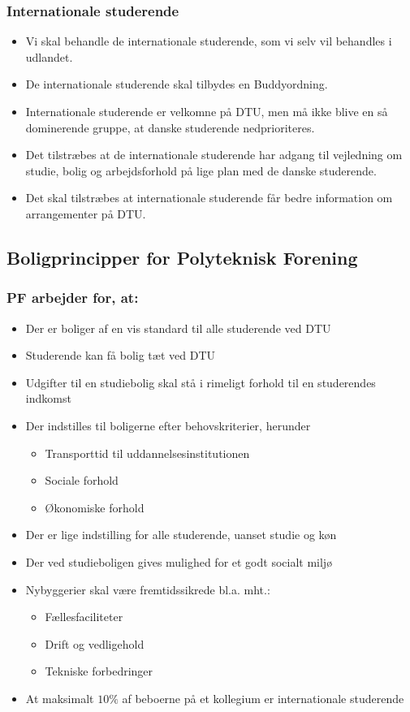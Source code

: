 \subsubsection{Internationale studerende}
\begin{itemize}
\item Vi skal behandle de internationale studerende, som vi selv vil behandles i udlandet.
\item De internationale studerende skal tilbydes en Buddyordning.
\item Internationale studerende er velkomne på DTU, men må ikke blive en så dominerende gruppe, at danske studerende nedprioriteres.
\item Det tilstræbes at de internationale studerende har adgang til vejledning om studie, bolig og arbejdsforhold på lige plan med de danske studerende.
\item Det skal tilstræbes at internationale studerende får bedre information om arrangementer på DTU.
\end{itemize}

\subsection{Boligprincipper for Polyteknisk Forening}
\subsubsection{PF arbejder for, at:}
\begin{itemize}
\item Der er boliger af en vis standard til alle studerende ved DTU
\item Studerende kan få bolig tæt ved DTU
\item Udgifter til en studiebolig skal stå i rimeligt forhold til en studerendes indkomst
\item Der indstilles til boligerne efter behovskriterier, herunder
	\begin{itemize}
	\item Transporttid til uddannelsesinstitutionen
	\item Sociale forhold
	\item Økonomiske forhold
	\end{itemize}
\item Der er lige indstilling for alle studerende, uanset studie og køn
\item Der ved studieboligen gives mulighed for et godt socialt miljø
\item Nybyggerier skal være fremtidssikrede bl.a. mht.:
	\begin{itemize}
\item  Fællesfaciliteter
\item Drift og vedligehold
\item Tekniske forbedringer
	\end{itemize}
\item At maksimalt $10\%$ af beboerne på et kollegium er internationale studerende
\end{itemize}

